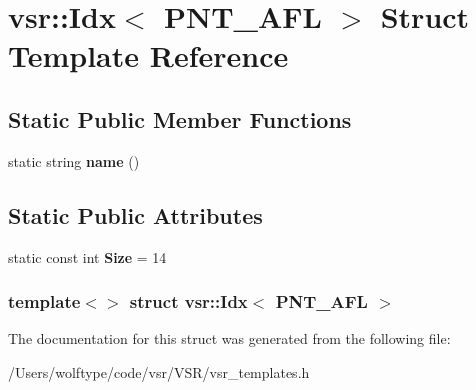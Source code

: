 \hypertarget{structvsr_1_1_idx_3_01_p_n_t___a_f_l_01_4}{\section{vsr\-:\-:Idx$<$ P\-N\-T\-\_\-\-A\-F\-L $>$ Struct Template Reference}
\label{structvsr_1_1_idx_3_01_p_n_t___a_f_l_01_4}
}
\subsection*{Static Public Member Functions}
\begin{DoxyCompactItemize}
\item 
\hypertarget{structvsr_1_1_idx_3_01_p_n_t___a_f_l_01_4_a7ee08d9c0c362b37b6a90a7ad8235fa1}{static string {\bfseries name} ()}\label{structvsr_1_1_idx_3_01_p_n_t___a_f_l_01_4_a7ee08d9c0c362b37b6a90a7ad8235fa1}

\end{DoxyCompactItemize}
\subsection*{Static Public Attributes}
\begin{DoxyCompactItemize}
\item 
\hypertarget{structvsr_1_1_idx_3_01_p_n_t___a_f_l_01_4_a283efeec8e01ff022a74623438b42660}{static const int {\bfseries Size} = 14}\label{structvsr_1_1_idx_3_01_p_n_t___a_f_l_01_4_a283efeec8e01ff022a74623438b42660}

\end{DoxyCompactItemize}
\subsubsection*{template$<$$>$ struct vsr\-::\-Idx$<$ P\-N\-T\-\_\-\-A\-F\-L $>$}



The documentation for this struct was generated from the following file\-:\begin{DoxyCompactItemize}
\item 
/\-Users/wolftype/code/vsr/\-V\-S\-R/vsr\-\_\-templates.\-h\end{DoxyCompactItemize}
